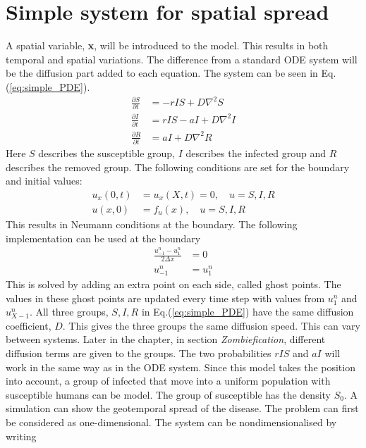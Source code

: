 \documentclass[%
twoside,                 %
final,                   %
chapterprefix=true,      %
open=right               %
10pt]{book}
\begin{document}
\section{Simple system for spatial spread}
\label{section:PDE_simple_system}
A spatial variable, \textbf{x}, will be introduced to the model. This results in both temporal and spatial variations. The difference from a standard ODE system will be the diffusion part added to each equation. The system can be seen in Eq.(\ref{eq:simple_PDE}). 
\begin{equation} \label{eq:simple_PDE}
	\begin{aligned}
	\frac{\partial S}{\partial t} &= -rIS + D\nabla ^2 S\\
	\frac{\partial I}{\partial t} &= rIS- aI + D\nabla ^2 I\\
	\frac{\partial R}{\partial t} &= aI + D\nabla ^2 R
	\end{aligned}
\end{equation}
Here $S$ describes the susceptible group, $I$ describes the infected group and $R$ describes the removed group. The following conditions are set for the boundary and initial values:
\begin{equation} \label{eq:boundary_initial}
	\begin{aligned}
	u_x(0,t) &= u_x(X,t) = 0,\quad u = S,I,R\\
	u(x,0) &= f_u(x),\quad u= S,I,R
	\end{aligned}
\end{equation}
This results in Neumann conditions at the boundary. The following implementation can be used at the boundary
\begin{equation}
	\begin{aligned}
	\frac{u_{-1}^n - u_1^n}{2\Delta x} &= 0 \\
	u_{-1}^n &= u_1^n
	\end{aligned}
\end{equation}
This is solved by adding an extra point on each side, called ghost points. The values in these ghost points are updated every time step with values from $u_1^n$ and $u_{X-1}^n$. All three groups, $S,I,R$ in Eq.(\ref{eq:simple_PDE}) have the same diffusion coefficient, $D$. This gives the three groups the same diffusion speed. This can vary between systems. Later in the chapter, in section \emph{Zombiefication}, different diffusion terms are given to the groups. The two probabilities $rIS$ and $aI$ will work in the same way as in the ODE system. Since this model takes the position into account, a group of infected that move into a uniform population with susceptible humans can be model. The group of susceptible has the density $S_0$. A simulation can show the geotemporal spread of the disease. The problem can first be considered as one-dimensional. The system can be nondimensionalised by writing 
\end{document}
